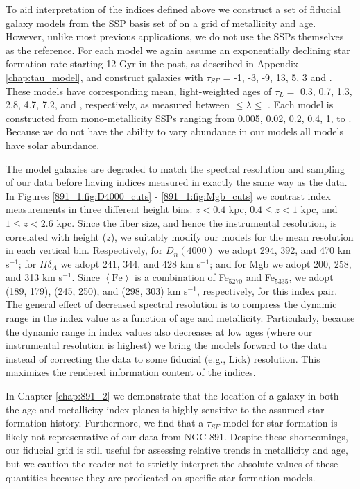 To aid interpretation of the indices defined above we construct a set
of fiducial galaxy models from the SSP basis set of \citet{Bruzual03}
on a grid of metallicity and age. However, unlike most previous
applications, we do not use the SSPs themselves as the reference. For
each model we again assume an exponentially declining star formation
rate starting 12 Gyr in the past, as described in Appendix
\ref{chap:tau_model}, and construct galaxies with $\tau_{SF}$ = -1, -3,
-9, 13, 5, 3 and . These models have corresponding mean,
light-weighted ages of $\tau_L = $ 0.3, 0.7, 1.3, 2.8, 4.7, 7.2, and
, respectively, as measured between 
$\leq\lambda\leq$ . Each model is constructed from
mono-metallicity SSPs ranging from 0.005, 0.02, 0.2, 0.4, 1, to
. Because we do not have the ability to vary abundance
in our models \citep[as done, for example, by][]{Trager08} all models
have solar abundance. 

The model galaxies are degraded to match the spectral resolution and
sampling of our \GP data before having indices measured in exactly the
same way as the data. In Figures \ref{891_1:fig:D4000_cuts} -
\ref{891_1:fig:Mgb_cuts} we contrast index measurements in three
different height bins: $z<0.4$ kpc, $0.4\leq z<1$ kpc, and $1\leq
z<2.6$ kpc. Since the fiber size, and hence the instrumental
resolution, is correlated with height ($z$), we suitably modify our
models for the mean resolution in each vertical bin. Respectively, for
$D_n(4000)$ we adopt 294, 392, and 470 km s$^{-1}$; for $H\delta_A$ we
adopt 241, 344, and 428 km s$^{-1}$; and for Mgb we adopt 200, 258,
and 313 km s$^{-1}$. Since $\left<\mathrm{Fe}\right>$ is a combination
of Fe$_{5270}$ and Fe$_{5335}$, we adopt (189, 179), (245, 250), and
(298, 303) km s$^{-1}$, respectively, for this index pair.  The
general effect of decreased spectral resolution is to compress the
dynamic range in the index value as a function of age and
metallicity. Particularly, because the dynamic range in index values
also decreases at low ages (where our instrumental resolution is
highest) we bring the models forward to the data instead of
correcting the data to some fiducial (e.g., Lick) resolution. This
maximizes the rendered information content of the indices.

In Chapter \ref{chap:891_2} we demonstrate that the location of a
galaxy in both the age and metallicity index planes is highly
sensitive to the assumed star formation history. Furthermore, we find
that a $\tau_{SF}$ model for star formation is likely not
representative of our data from NGC 891. Despite these shortcomings,
our fiducial grid is still useful for assessing relative trends in
metallicity and age, but we caution the reader not to strictly
interpret the absolute values of these quantities because they are
predicated on specific star-formation models.

